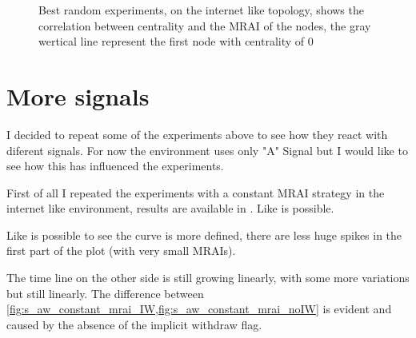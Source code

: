 \documentclass[10pt,conference,letterpaper]{IEEEtran}
\newcommand{\figvspace}{-1.5em}
\begin{document}
\begin{figure}[tb]
	\caption{Best random experiments, on the internet like topology, shows the 
			 correlation between centrality and the \ac{MRAI} of the nodes, the
			 gray wertical line represent the first node with centrality of 0
			}
	\label{fig:random_study}
	\vspace{\figvspace}
\end{figure}

\section{More signals}
\label{sec:more_signals}

I decided to repeat some of the experiments above to see how they react with diferent
signals.
For now the environment uses only "A" Signal but I would like to see how this 
has influenced the experiments.

First of all I repeated the experiments with a constant \ac{MRAI} strategy in
the internet like environment, results are available in .
Like is possible.

Like is possible to see the curve is more defined, there are less huge spikes in the
first part of the plot (with very small \ac{MRAI}s).

The time line on the other side is still growing linearly, with some more variations
but still linearly.
The difference between \cref{fig:s_aw_constant_mrai_IW,fig:s_aw_constant_mrai_noIW}
is evident and caused by the absence of the implicit withdraw flag.
\end{document}
